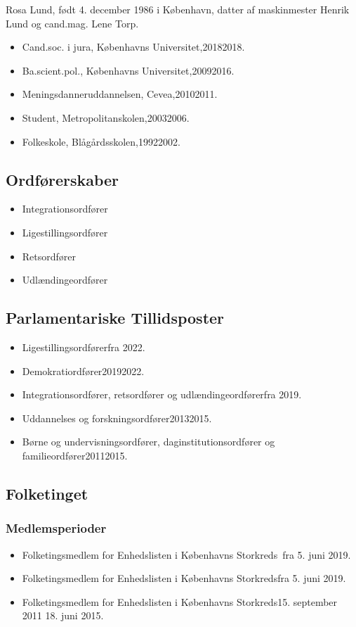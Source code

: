 \documentclass[11pt, a4paper]{awesome-cv}
\begin{document}
\makecvheader[R]
\makelettertitle
\begin{cvletter}
Rosa Lund, født 4. december 1986 i København, datter af maskinmester Henrik Lund og cand.mag. Lene Torp.

\begin{itemize}
\item Cand.soc. i jura, Københavns Universitet,20182018.
\item Ba.scient.pol., Københavns Universitet,20092016.
\item Meningsdanneruddannelsen, Cevea,20102011.
\item Student, Metropolitanskolen,20032006.
\item Folkeskole, Blågårdsskolen,19922002.
\end{itemize}
\subsection*{Ordførerskaber}
\begin{itemize}
\item Integrationsordfører
\item Ligestillingsordfører
\item Retsordfører
\item Udlændingeordfører
\end{itemize}
\subsection*{Parlamentariske Tillidsposter}
\begin{itemize}
\item Ligestillingsordførerfra 2022.
\item Demokratiordfører20192022.
\item Integrationsordfører, retsordfører og udlændingeordførerfra 2019.
\item Uddannelses og forskningsordfører20132015.
\item Børne og undervisningsordfører, daginstitutionsordfører og familieordfører20112015.
\end{itemize}
\subsection*{Folketinget}
\subsubsection*{Medlemsperioder}
\begin{itemize}
\item Folketingsmedlem for Enhedslisten i Københavns Storkreds fra 5. juni 2019.
\item Folketingsmedlem for Enhedslisten i Københavns Storkredsfra 5. juni 2019.
\item Folketingsmedlem for Enhedslisten i Københavns Storkreds15. september 2011  18. juni 2015.
\end{itemize}

\end{cvletter}
\end{document}
